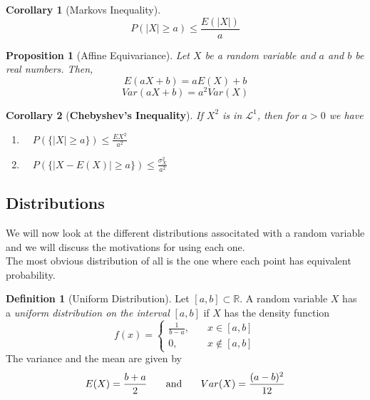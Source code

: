 \documentclass{article}
\newtheorem{corollary}{Corollary}[section]
\newtheorem{proposition}{Proposition}[section]
\theoremstyle{definition}
\newtheorem{definition}{Definition}[section]
\theoremstyle{remark}
\begin{document}
\vspace{.5cm}





\begin{corollary}[Markovs Inequality] \label{Markovs Inequality}
\[
P({|X| \geq a}) \leq \frac{E(|X|)}{a}
\]

\end{corollary}




\vspace{.5cm}





\begin{proposition}[Affine Equivariance]
Let $X$ be a random variable and $a$ and $b$ be real numbers. Then,
\[
E(aX + b) = aE(X) + b
\]
\[
Var(aX + b) = a^2Var(X)
\]
\end{proposition}



\vspace{.5cm}





\begin{corollary}[\textbf{Chebyshev's Inequality}]
If $X^2$ is in $\mathcal{L}^1$, then for $a>0$ we have
\begin{enumerate}
\item $ \quad P(\{|X| \geq a\}) \leq \frac{E{X^2}}{a^2}$
\item $ \quad P(\{|X - E(X)| \geq a\}) \leq \frac{\sigma^2_X}{a^2}$
\end{enumerate}

\end{corollary}





\subsection{Distributions}
We will now look at the different distributions associtated with a random variable
and we will discuss the motivations for using each one.\\
The most obvious distribution of all is the one where each point has equivalent probability. 

\begin{definition}[Uniform Distribution]
Let $[a,b]\subset \mathbb{R}$. A random variable
$X$ has a \textit{uniform distribution on the interval} $[a,b]$ if $X$
has the density function
\[
f(x) = \begin{cases}
    \frac{1}{b-a},\quad & x \in [a,b]\\
    0, \quad & x \notin [a,b]
\end{cases}
\]
The variance and the mean are given by
\[
E(X) = \frac{b+a}{2} \; \quad \; \textnormal{ and } \; \quad \; Var(X) = \frac{(a-b)^2}{12}
\]
\end{definition}
\end{document}
